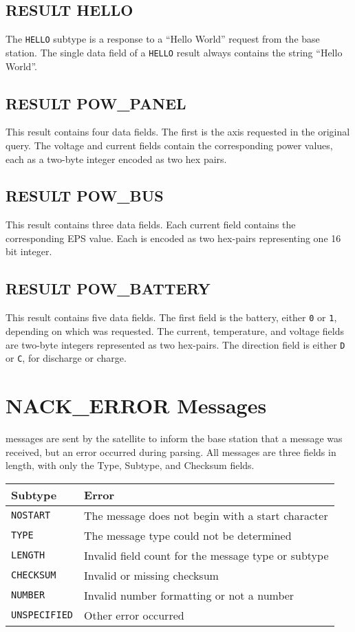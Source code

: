 \documentclass{article}
\begin{document}
  \subsection{RESULT HELLO}
    The \texttt{HELLO} subtype is a response to a ``Hello World'' request from the base station.
    The single data field of a \texttt{HELLO} result always contains the string ``Hello World''.

    
  \subsection{RESULT POW\_PANEL}
    This result contains four data fields. The first is the axis requested in the original query.
    The voltage and current fields contain the corresponding power values, each as a two-byte integer encoded as two hex 
    pairs.
    
  \subsection{RESULT POW\_BUS}
    This result contains three data fields. Each current field contains the corresponding EPS value. Each is encoded as
    two hex-pairs representing one 16 bit integer.
    
  \subsection{RESULT POW\_BATTERY}
    This result contains five data fields. The first field is the battery, either \texttt{0} or \texttt{1}, depending
    on which was requested. The current, temperature, and voltage fields are two-byte integers represented as two hex-pairs.
    The direction field is either \texttt{D} or \texttt{C}, for discharge or charge.
    
\section{NACK\_ERROR Messages}
  \merror messages are sent by the satellite to inform the base station that a message was received, but an error
  occurred during parsing. All \merror messages are three fields in length, with only the Type, Subtype, and Checksum fields.
  
  \begin{center}
    \begin{tabular}{| l | l |}
      \hline
      Subtype & Error \\ \hline
      \texttt{NOSTART} & The message does not begin with a start character \\
      \texttt{TYPE} & The message type could not be determined \\
      \texttt{LENGTH} & Invalid field count for the message type or subtype \\
      \texttt{CHECKSUM} & Invalid or missing checksum \\
      \texttt{NUMBER} & Invalid number formatting or not a number \\
      \texttt{UNSPECIFIED} & Other error occurred \\
      \hline
    \end{tabular}
  \end{center}
\end{document}
